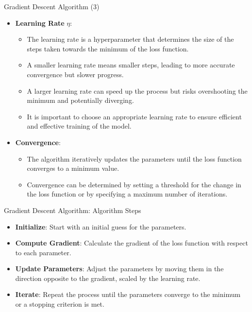 \documentclass[10pt, hyperref={colorlinks = true,linkcolor = blue}]{beamer}
\begin{document}
{{\begin{frame}{Gradient Descent Algorithm (3)}
 \begin{itemize}[<+->]
    \item \textbf{Learning Rate} $\eta$:
    \begin{itemize}
        \item The learning rate is a hyperparameter that determines the size of the steps taken towards the minimum of the loss function.
        \item A smaller learning rate means smaller steps, leading to more accurate convergence but slower progress.
        \item A larger learning rate can speed up the process but risks overshooting the minimum and potentially diverging.
        \item It is important to choose an appropriate learning rate to ensure efficient and effective training of the model.
    \end{itemize}
   
    \item \textbf{Convergence}:
    \begin{itemize}
        \item The algorithm iteratively updates the parameters until the loss function converges to a minimum value.
        \item Convergence can be determined by setting a threshold for the change in the loss function or by specifying a maximum number of iterations.
    \end{itemize}
     \end{itemize}
\end{frame}

\begin{frame}{Gradient Descent Algorithm: Algorithm Steps}
 \begin{itemize}[<+->]
        \item \textbf{Initialize}: Start with an initial guess for the parameters.
        \item \textbf{Compute Gradient}: Calculate the gradient of the loss function with respect to each parameter.
        \item \textbf{Update Parameters}: Adjust the parameters by moving them in the direction opposite to the gradient, scaled by the learning rate.
        \item \textbf{Iterate}: Repeat the process until the parameters converge to the minimum or a stopping criterion is met.
    \end{itemize}
\end{frame}

}}
\end{document}
